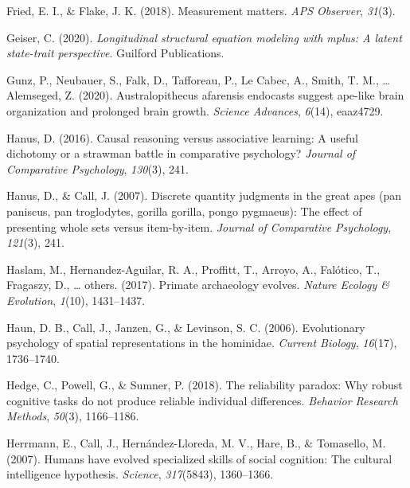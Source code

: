 \documentclass[
  man,floatsintext]{apa6}
\newlength{\cslhangindent}
\newlength{\cslentryspacingunit} %
\newenvironment{CSLReferences}[2] %
 {%
  \setlength{\parindent}{0pt}
  \ifodd #1
  \let\oldpar\par
  \def\par{\hangindent=\cslhangindent\oldpar}
  \fi
  \setlength{\parskip}{#2\cslentryspacingunit}
 }%
 {}
\begin{document}
\begin{CSLReferences}{1}{0}
\leavevmode{}%
Fried, E. I., \& Flake, J. K. (2018). Measurement matters. \emph{APS Observer}, \emph{31}(3).

\leavevmode{}%
Geiser, C. (2020). \emph{Longitudinal structural equation modeling with mplus: A latent state-trait perspective}. Guilford Publications.

\leavevmode{}%
Gunz, P., Neubauer, S., Falk, D., Tafforeau, P., Le Cabec, A., Smith, T. M., \ldots{} Alemseged, Z. (2020). Australopithecus afarensis endocasts suggest ape-like brain organization and prolonged brain growth. \emph{Science Advances}, \emph{6}(14), eaaz4729.

\leavevmode{}%
Hanus, D. (2016). Causal reasoning versus associative learning: A useful dichotomy or a strawman battle in comparative psychology? \emph{Journal of Comparative Psychology}, \emph{130}(3), 241.

\leavevmode{}%
Hanus, D., \& Call, J. (2007). Discrete quantity judgments in the great apes (pan paniscus, pan troglodytes, gorilla gorilla, pongo pygmaeus): The effect of presenting whole sets versus item-by-item. \emph{Journal of Comparative Psychology}, \emph{121}(3), 241.

\leavevmode{}%
Haslam, M., Hernandez-Aguilar, R. A., Proffitt, T., Arroyo, A., Falótico, T., Fragaszy, D., \ldots{} others. (2017). Primate archaeology evolves. \emph{Nature Ecology \& Evolution}, \emph{1}(10), 1431--1437.

\leavevmode{}%
Haun, D. B., Call, J., Janzen, G., \& Levinson, S. C. (2006). Evolutionary psychology of spatial representations in the hominidae. \emph{Current Biology}, \emph{16}(17), 1736--1740.

\leavevmode{}%
Hedge, C., Powell, G., \& Sumner, P. (2018). The reliability paradox: Why robust cognitive tasks do not produce reliable individual differences. \emph{Behavior Research Methods}, \emph{50}(3), 1166--1186.

\leavevmode{}%
Herrmann, E., Call, J., Hernández-Lloreda, M. V., Hare, B., \& Tomasello, M. (2007). Humans have evolved specialized skills of social cognition: The cultural intelligence hypothesis. \emph{Science}, \emph{317}(5843), 1360--1366.


\end{CSLReferences}
\end{document}
